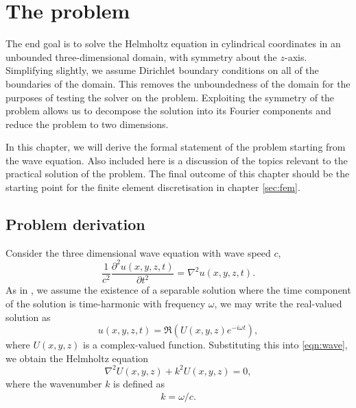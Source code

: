 \chapter{The problem}
\label{sec:problem}

\iffalse

Background definitions, notations, etc.
Problem definition
	- Relation to Helmholtz
Boundary condition
	- Sommerfeld
	- PML/ABC/DtN
Shifted Laplace operator


The Poisson problem:
	- Well behaved
	- Eigenvalues of the residual
	- Optimal method for finding solution

Helmholtz problem:
	- Misbehaved
	- Poor convergence
	- Indefinite discretisation matrix
\fi

The end goal is to solve the Helmholtz equation in cylindrical coordinates in an unbounded three-dimensional domain, with symmetry about the $z$-axis.
Simplifying slightly, we assume Dirichlet boundary conditions on all of the boundaries of the domain.
This removes the unboundedness of the domain for the purposes of testing the solver on the problem.
Exploiting the symmetry of the problem allows us to decompose the solution into its Fourier components and reduce the problem to two dimensions.

In this chapter, we will derive the formal statement of the problem starting from the wave equation.
Also included here is a discussion of the topics relevant to the practical solution of the problem.
The final outcome of this chapter should be the starting point for the finite element discretisation in chapter \ref{sec:fem}.





\section{Problem derivation}

Consider the three dimensional wave equation with wave speed $c$,
\begin{equation}
	\frac{1}{c^2} \frac{\partial^2 u(x,y,z,t)}{\partial t^2} = \nabla^2 u(x,y,z,t). \label{eqn:wave}
\end{equation}
As in \cite{oomph_hh}, we assume the existence of a separable solution where the time component of the solution is time-harmonic with frequency $\omega$,
we may write the real-valued solution as
\[
	u(x,y,z,t) = \Re \left( U(x,y,z)e^{-i\omega t} \right),
\]
where $U(x,y,z)$ is a complex-valued function.
Substituting this into \eqref{eqn:wave}, we obtain the Helmholtz equation
\begin{equation}
	\nabla^2 U(x,y,z) + k^2 U(x,y,z) = 0, \label{eqn:hh}
\end{equation}
where the wavenumber $k$ is defined as
\begin{align}
	k=\omega/c.
\end{align}

